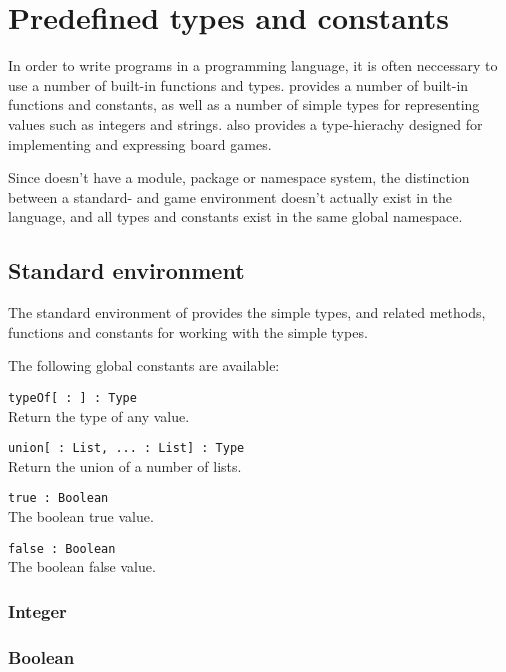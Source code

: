 \section{Predefined types and constants}
\label{sec:predefined}

In order to write programs in a programming language, it is often neccessary to use a number of built-in
functions and types. \productname{} provides a number of built-in functions and constants, as well as 
a number of simple types for representing values such as integers and strings. \productname{} also provides
a type-hierachy designed for implementing and expressing board games.

Since \productname{} doesn't have a module, package or namespace system, the distinction between a standard-
and game environment doesn't actually exist in the language, and all types and constants exist in the same
global namespace.

\subsection{Standard environment}

The standard environment of \productname{} provides the simple types, and related methods, functions and
constants for working with the simple types.

The following global constants are available:

\begin{dlist}
  \item \texttt{typeOf[ : \opstar] : Type}\\
    Return the type of any value.
  \item \texttt{union[ : List, ...  : List] : Type}\\
    Return the union of a number of lists.
  \item \texttt{true : Boolean}\\
    The boolean true value.
  \item \texttt{false : Boolean}\\
    The boolean false value.
\end{dlist}

\subsubsection{Integer}

\subsubsection{Boolean}

